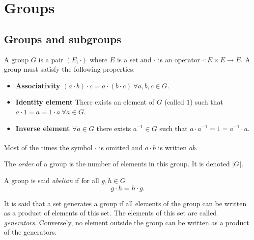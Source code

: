 \section{Groups}

\subsection{Groups and subgroups}

\begin{definition}[Group]
  A group $G$ is a pair $(E, \cdot)$ where $E$ is a set and $\cdot$ is an operator $\cdot: E \times E \to E$. A group must satisfy the following properties:
  \begin{itemize}
    \item \textbf{Associativity} $(a \cdot b) \cdot c = a \cdot (b \cdot c)\ \forall a,b,c \in G$.
    \item \textbf{Identity element} There exists an element of $G$ (called $1$) such that $a \cdot 1 = a = 1 \cdot a \ \forall a \in G$.
    \item \textbf{Inverse element} $\forall a \in G$ there exists $a^{-1} \in G$ such that $a \cdot a^{-1} = 1 = a^{-1} \cdot a$.
  \end{itemize}
\end{definition}

\paragraph{}
Most of the times the symbol $\cdot$ is omitted and $a \cdot b$ is written $ab$.

\begin{definition}[Order]
  The \textit{order} of a group is the number of elements in this group. It is denoted $|G|$.
\end{definition}

\begin{definition}
  A group is said \textit{abelian} if for all $g, h \in G$
  \[
    g \cdot h = h \cdot g.
  \]
\end{definition}

\begin{definition}
  It is said that a set generates a group if all elements of the group can be written as a product of elements of this set. The elements of this set are called \textit{generators}. Conversely, no element outside the group can be written as a product of the generators.
\end{definition}

